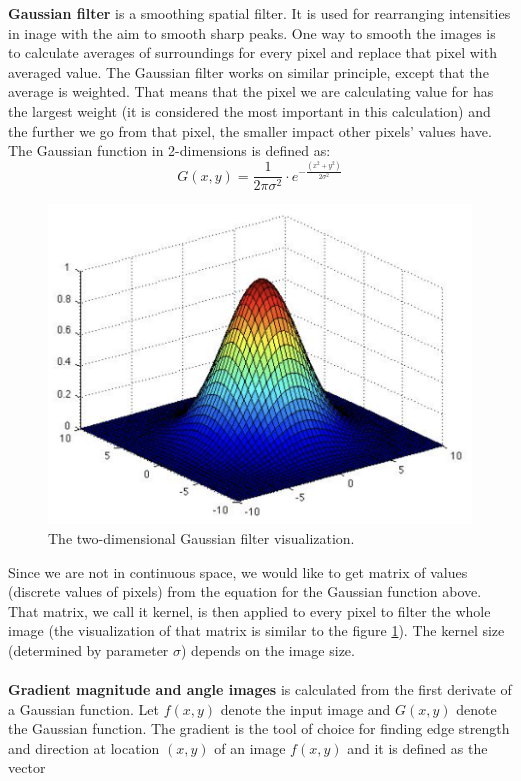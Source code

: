 \documentclass[a4paper,11pt]{article}
\begin{document}
\noindent
\textbf{Gaussian filter} is a smoothing spatial filter. It is used for rearranging intensities in inage with the aim to smooth sharp peaks.
One way to smooth the images is to calculate averages of surroundings for every pixel and replace that pixel with averaged value. 
The Gaussian filter works on similar principle, except that the average is weighted. 
That means that the pixel we are calculating value for has the largest weight (it is considered the most important in this calculation)
and the further we go from that pixel, the smaller impact other pixels' values have.
\\
The Gaussian function in 2-dimensions is defined as:
$$ 
G(x, y) = \frac{1}{2 \pi \sigma ^2} \cdot e^{- \frac{(x^2 + y^2)}{2 \sigma ^2}} 
$$
\begin{figure}[ht!]
    \centering
    \includegraphics[width=120mm]{gaussian_filter.png}
    \caption{The two-dimensional Gaussian filter visualization.}
    \label{pic:gauss}
\end{figure}
\noindent
Since we are not in continuous space, we would like to get matrix of values (discrete values of pixels) from the equation for the Gaussian function above.
That matrix, we call it kernel, is then applied to every pixel to filter the whole image (the visualization of that matrix is similar to the figure \ref{pic:gauss}).
The kernel size (determined by parameter $\sigma$) depends on the image size.
\\
\\
\textbf{Gradient magnitude and angle images} is calculated from the first derivate of a Gaussian function.
Let $f(x,y)$ denote the input image and $G(x,y)$ denote the Gaussian function. 
The gradient is the tool of choice for finding edge strength and direction at location $(x,y)$ of an image $f(x,y)$ and it is defined as the vector 
\end{document}
